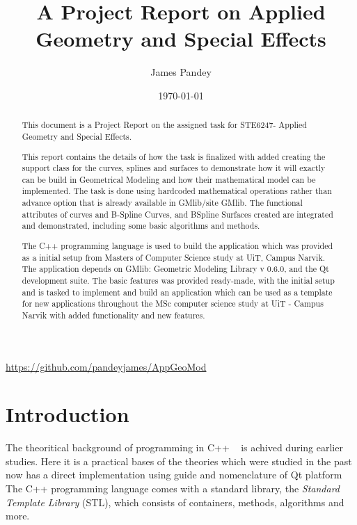 \documentclass[a4,10pt]{article}
\title{A Project Report on Applied Geometry and Special Effects}
\author{James Pandey}
\date{\today}
\begin{document}
	  \maketitle
          \begin{center}
            \url{https://github.com/pandeyjames/AppGeoMod}
           \end{center}
          \begin{abstract}
	    This document is a Project Report on the assigned task for STE6247- Applied Geometry and Special Effects.
	
	    This report contains the details of how the task is finalized with added creating the support class for the curves, splines and surfaces to demonstrate how it will exactly can be build in Geometrical Modeling and how their mathematical model can be implemented.
	    The task is done using hardcoded mathematical operations rather than advance option that is already available in GMlib/site GMlib. The functional attributes of curves and B-Spline Curves, and BSpline Surfaces created are integrated and demonstrated, including some basic algorithms and methods.
	
	    The C++ programming language is used to build the application which was provided as a initial setup from Masters of Computer Science study at UiT, Campus Narvik.
	    The application depends on GMlib: Geometric Modeling Library v 0.6.0, and the Qt development suite.
	    The basic features was provided ready-made, with the initial setup and is tasked to implement and build an application which can be used as a template for new applications
	    throughout the MSc computer science study at UiT - Campus Narvik with added functionality and new features.
	  \end{abstract}
	
	
	 
	
	  \section{Introduction}
            The theoritical background of programming in C++ ~\cite{wesley:2013} is achived during earlier studies.
            Here it is a practical bases of the theories which were studied in the past now has a direct implementation using guide and nomenclature of Qt platform~\cite{guide:2016}
	    The C++ programming language comes with a standard library, the \emph{Standard Template Library} (STL), which consists of containers, methods, algorithms and more.
	
\end{document}
